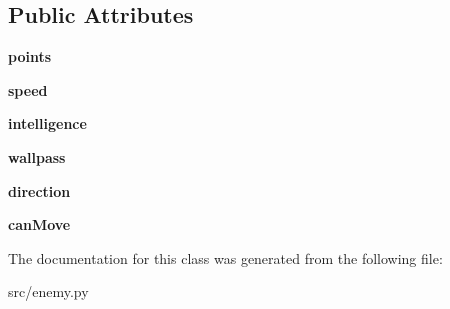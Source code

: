 \subsection*{Public Attributes}
\begin{DoxyCompactItemize}
\item 
\hypertarget{classsrc_1_1enemy_1_1_enemy_ae9fc7353b9fbbad3c2d0330169a14fe5}{}{\bfseries points}\label{classsrc_1_1enemy_1_1_enemy_ae9fc7353b9fbbad3c2d0330169a14fe5}

\item 
\hypertarget{classsrc_1_1enemy_1_1_enemy_a24e64f3d82db0537f8438780bb1b082d}{}{\bfseries speed}\label{classsrc_1_1enemy_1_1_enemy_a24e64f3d82db0537f8438780bb1b082d}

\item 
\hypertarget{classsrc_1_1enemy_1_1_enemy_a11c139459feab2281e0804adc1e0276d}{}{\bfseries intelligence}\label{classsrc_1_1enemy_1_1_enemy_a11c139459feab2281e0804adc1e0276d}

\item 
\hypertarget{classsrc_1_1enemy_1_1_enemy_a3efd2aacdc7f1eca427075919649c09e}{}{\bfseries wallpass}\label{classsrc_1_1enemy_1_1_enemy_a3efd2aacdc7f1eca427075919649c09e}

\item 
\hypertarget{classsrc_1_1enemy_1_1_enemy_ad232e0c586291fffbc676d6b20658cd2}{}{\bfseries direction}\label{classsrc_1_1enemy_1_1_enemy_ad232e0c586291fffbc676d6b20658cd2}

\item 
\hypertarget{classsrc_1_1enemy_1_1_enemy_aca96a4793e02437f1f33a1c3cbefd133}{}{\bfseries can\+Move}\label{classsrc_1_1enemy_1_1_enemy_aca96a4793e02437f1f33a1c3cbefd133}

\end{DoxyCompactItemize}


The documentation for this class was generated from the following file\+:\begin{DoxyCompactItemize}
\item 
src/enemy.\+py\end{DoxyCompactItemize}
